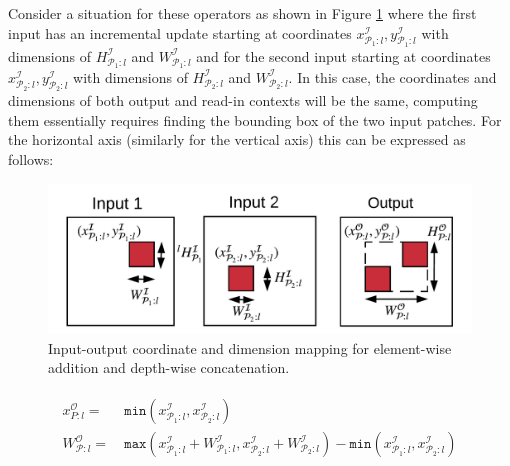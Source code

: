 Consider a situation for these operators as shown in Figure \ref{fig:la_operators} where the first input has an incremental update starting at coordinates $x^\mathcal{I}_{\mathcal{P}_1:l},y^\mathcal{I}_{\mathcal{P}_1:l}$ with dimensions of $H^\mathcal{I}_{\mathcal{P}_1:l}$ and $W^\mathcal{I}_{\mathcal{P}_1:l}$ and for the second input starting at coordinates $x^\mathcal{I}_{\mathcal{P}_2:l},y^\mathcal{I}_{\mathcal{P}_2:l}$ with dimensions of $H^\mathcal{I}_{\mathcal{P}_2:l}$ and $W^\mathcal{I}_{\mathcal{P}_2:l}$.
In this case, the coordinates and dimensions of both output and read-in contexts will be the same, computing them essentially requires finding the bounding box of the two input patches.
For the horizontal axis (similarly for the vertical axis) this can be expressed as follows:

\begin{figure}[t]
\includegraphics[width=\columnwidth]{images/la_operators}
\caption{Input-output coordinate and dimension mapping for element-wise addition and depth-wise concatenation.}
\label{fig:la_operators}
\end{figure}

\begin{align}
\begin{split}
x^\mathcal{O}_{P:l} =&~ \texttt{min}(x^\mathcal{I}_{\mathcal{P}_1:l}, x^\mathcal{I}_{\mathcal{P}_2:l})\\
W^\mathcal{O}_{\mathcal{P}:l} =&~ \texttt{max}(x^\mathcal{I}_{\mathcal{P}_1:l}+W^\mathcal{I}_{\mathcal{P}_1:l},x^\mathcal{I}_{\mathcal{P}_2:l}+W^\mathcal{I}_{\mathcal{P}_2:l}) -\texttt{min}(x^\mathcal{I}_{\mathcal{P}_1:l},x^\mathcal{I}_{\mathcal{P}_2:l})
\end{split}
\end{align}

